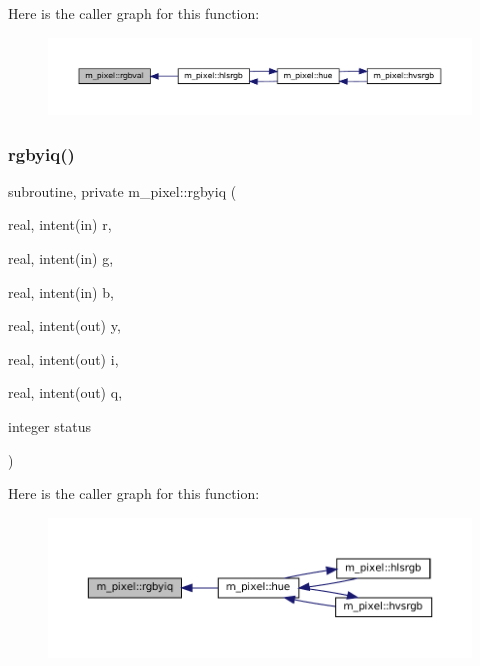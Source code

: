 Here is the caller graph for this function\+:
\nopagebreak
\begin{figure}[H]
\begin{center}
\leavevmode
\includegraphics[width=350pt]{namespacem__pixel_a9f8175d7b5b349cd5c30a99100eef5c5_icgraph}
\end{center}
\end{figure}
\mbox{\label{namespacem__pixel_a0c025b24458dba5fb448f62cb10c7088}} 
\subsubsection{\texorpdfstring{rgbyiq()}{rgbyiq()}}
{\footnotesize\ttfamily subroutine, private m\+\_\+pixel\+::rgbyiq (\begin{DoxyParamCaption}\item[{real, intent(in)}]{r,  }\item[{real, intent(in)}]{g,  }\item[{real, intent(in)}]{b,  }\item[{real, intent(out)}]{y,  }\item[{real, intent(out)}]{i,  }\item[{real, intent(out)}]{q,  }\item[{integer}]{status }\end{DoxyParamCaption})\hspace{0.3cm}{\ttfamily [private]}}

Here is the caller graph for this function\+:
\nopagebreak
\begin{figure}[H]
\begin{center}
\leavevmode
\includegraphics[width=350pt]{namespacem__pixel_a0c025b24458dba5fb448f62cb10c7088_icgraph}
\end{center}
\end{figure}
\mbox{\label{namespacem__pixel_a9b0fb9ccafe605fd6daf50c74347ed3a}} 
